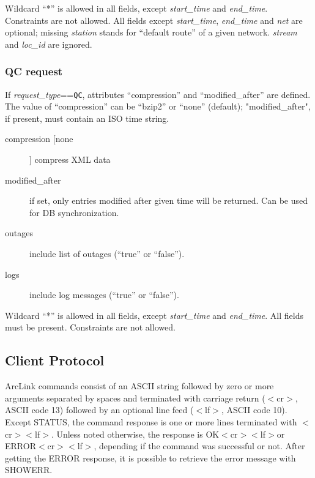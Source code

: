 \documentclass[11pt,a4paper,titlepage]{article}
\let\mylt<
\let\mygt>
\newcommand{\xcr}{$\mylt$cr$\mygt$}
\newcommand{\xlf}{$\mylt$lf$\mygt$}
\newcommand{\dfl}[1]{[#1]}
\begin{document}
Wildcard ``*'' is allowed in all fields, except \emph{start\_time} and
\emph{end\_time}.  Constraints are not allowed. All fields except
\emph{start\_time}, \emph{end\_time} and \emph{net} are optional; missing
\emph{station} stands for ``default route'' of a given network.
\emph{stream} and \emph{loc\_id} are ignored.


\subsubsection{QC request}

If \emph{request\_type}==\texttt{QC}, attributes ``compression'' and
``modified\_after'' are defined. The value of ``compression'' can be
``bzip2'' or ``none'' (default); "modified\_after", if present, must
contain an ISO time string.

\begin{description}
\item[compression \dfl{none}] compress XML data
\item[modified\_after] if set, only entries modified after given time will be
    returned. Can be used for DB synchronization.
\item[outages] include list of outages (``true'' or ``false'').
\item[logs] include log messages (``true'' or ``false''). 
\end{description}

Wildcard ``*'' is allowed in all fields, except \emph{start\_time} and
\emph{end\_time}. All fields must be present. Constraints are not allowed.


\subsection{Client Protocol}

ArcLink commands consist of an ASCII string followed by zero or more
arguments separated by spaces and terminated with carriage return
(\xcr, ASCII code 13) followed by an optional line feed (\xlf,
ASCII code 10).  Except STATUS, the command response is one or more lines
terminated with \xcr\xlf. Unless noted otherwise, the response is
OK\xcr\xlf or ERROR\xcr\xlf, depending if the command was
successful or not. After getting the ERROR response, it is possible to
retrieve the error message with SHOWERR.
\end{document}
